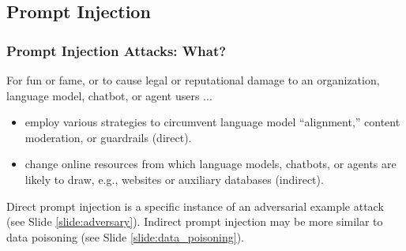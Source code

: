 \documentclass[11pt,
               aspectratio=169,
               hyperref={colorlinks}
               ]{beamer}
\begin{document}
		\subsection{Prompt Injection}

			\begin{frame}
	
				\frametitle{Prompt Injection Attacks: \textbf{What?}}	
				
				\indent For fun or fame, or to cause legal or reputational damage to an organization, language model, chatbot, or agent users ... 
				
				\begin{itemize}
					\item employ various strategies to circumvent language model ``alignment,'' content moderation, or guardrails (direct). 
					\item change online resources from which language models, chatbots, or agents are likely to draw, e.g., websites or auxiliary databases (indirect). 
				\end{itemize}
					
				Direct prompt injection is a specific instance of an adversarial example attack (see Slide \ref{slide:adversary}). Indirect prompt injection may be more similar to data poisoning (see Slide \ref{slide:data_poisoning}). 

			\end{frame}
\end{document}
